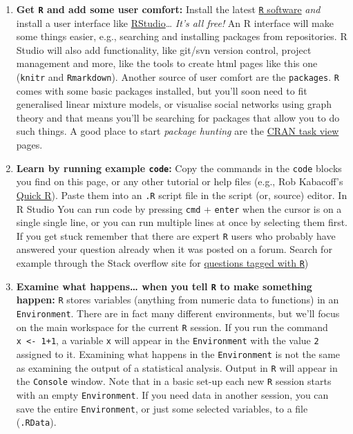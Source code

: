 \documentclass[12pt,]{book}
\begin{document}
\begin{enumerate}
\def\labelenumi{\arabic{enumi}.}
\item
  \textbf{Get \texttt{R} and add some user comfort:} Install the latest \href{http://www.r-project.org}{\texttt{R} software} \emph{and} install a user interface like \href{http://www.rstudio.com}{RStudio}\ldots{} \emph{It's all free!} An R interface will make some things easier, e.g., searching and installing packages from repositories. R Studio will also add functionality, like git/svn version control, project management and more, like the tools to create html pages like this one (\texttt{knitr} and \texttt{Rmarkdown}). Another source of user comfort are the \texttt{packages}. \texttt{R} comes with some basic packages installed, but you'll soon need to fit generalised linear mixture models, or visualise social networks using graph theory and that means you'll be searching for packages that allow you to do such things. A good place to start \emph{package hunting} are the \href{http://cran.r-project.org/web/views/}{CRAN task view} pages.
\item
  \textbf{Learn by running example \texttt{code}:} Copy the commands in the \texttt{code} blocks you find on this page, or any other tutorial or help files (e.g., Rob Kabacoff's \href{http://www.statmethods.net}{Quick R}). Paste them into an \texttt{.R} script file in the script (or, source) editor. In R Studio You can run code by pressing \texttt{cmd} + \texttt{enter} when the cursor is on a single single line, or you can run multiple lines at once by selecting them first. If you get stuck remember that there are expert \texttt{R} users who probably have answered your question already when it was posted on a forum. Search for example through the Stack overflow site for \href{http://stackoverflow.com/questions/tagged/r}{questions tagged with \texttt{R}})
\item
  \textbf{Examine what happens\ldots{} when you tell \texttt{R} to make something happen:} \texttt{R} stores variables (anything from numeric data to functions) in an \texttt{Environment}. There are in fact many different environments, but we'll focus on the main workspace for the current \texttt{R} session. If you run the command \texttt{x\ \textless{}-\ 1+1}, a variable \texttt{x} will appear in the \texttt{Environment} with the value \texttt{2} assigned to it. Examining what happens in the \texttt{Environment} is not the same as examining the output of a statistical analysis. Output in \texttt{R} will appear in the \texttt{Console} window. Note that in a basic set-up each new \texttt{R} session starts with an empty \texttt{Environment}. If you need data in another session, you can save the entire \texttt{Environment}, or just some selected variables, to a file (\texttt{.RData}).

\end{enumerate}
\end{document}
